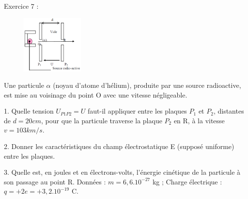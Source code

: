 \documentclass[12pt, french]{article}
\begin{document}
\begin{Box2}{Exercice 7 :}
  \begin{figure}
     \vspace{-0.75cm}
    \includegraphics[width=0.28\textwidth]{./img/img_03.png}
\end{figure}
   Une particule $\alpha$ (noyau d’atome d’hélium), produite par une source radioactive, est mise au voisinage du
point O avec une vitesse négligeable.

   1. Quelle tension $U_{P1P2} = U$ faut-il appliquer entre les plaques $P_1$ et $P_2$,
distantes de $d = 20cm$, pour que la particule traverse la plaque $P_2$ en R, à
la vitesse $v =103km/s$.

2. Donner les caractéristiques du champ électrostatique E (supposé uniforme) entre les plaques.

   3. Quelle est, en joules et en électrons-volts, l’énergie cinétique de la
particule à son passage au point R.
   Données : $m = 6,6.10^{-27}$ kg ; Charge électrique : $q = +2e = +3,2.10^{-19}$ C.
\end{Box2}
\end{document}
